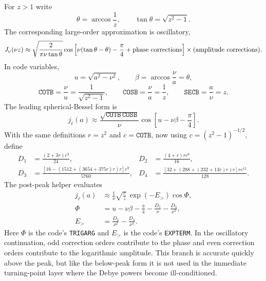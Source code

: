 \documentclass[11pt,a4paper]{article}
\newcommand{\code}[1]{\texttt{#1}}
\begin{document}
For $z>1$ write
\begin{equation}
  \theta=\arccos\frac{1}{z},\qquad
  \tan\theta=\sqrt{z^2-1}.
\end{equation}
The corresponding large-order approximation is oscillatory,
\begin{equation}
  J_\nu(\nu z) \approx
  \sqrt{\frac{2}{\pi\nu\tan\theta}}
  \cos\left[\nu(\tan\theta-\theta)-\frac{\pi}{4}+\hbox{phase corrections}\right]
  \times(\hbox{amplitude corrections}).
\end{equation}
In code variables,
\begin{equation}
  u=\sqrt{a^2-\nu^2},\qquad
  \beta=\arccos\frac{\nu}{a}=\theta,
\end{equation}
\begin{equation}
  \code{COTB}=\frac{\nu}{u}=\frac{1}{\sqrt{z^2-1}},
  \qquad
  \code{COSB}=\frac{\nu}{a}=\frac{1}{z},
  \qquad
  \code{SECB}=\frac{a}{\nu}=z .
\end{equation}
The leading spherical-Bessel form is
\begin{equation}
  j_\ell(a) \approx
  \frac{\sqrt{\code{COTB}\,\code{COSB}}}{\nu}
  \cos\left[u-\nu\beta-\frac{\pi}{4}\right].
\end{equation}
With the same definitions $r=z^2$ and $c=\code{COTB}$, now using
$c=(z^2-1)^{-1/2}$, define
\begin{align}
  D_1 &= \frac{(2+3r)c^3}{24},&
  D_2 &= \frac{(4+r)r c^6}{16},\\
  D_3 &= \frac{\left[16-\left(1512+(3654+375r)r\right)r\right]c^9}{5760},&
  D_4 &= \frac{\left[32+\left(288+(232+13r)r\right)r\right]r c^{12}}{128}.
  \label{eq:above-debye-polys}
\end{align}
The post-peak helper evaluates
\begin{align}
  j_\ell(a) &\approx \frac{1}{\nu}\sqrt{\frac{c}{z}}\,
    \exp(-E_{>})\cos\Phi,\\
  \Phi &= u-\nu\beta-\frac{\pi}{4}
    -\frac{D_1}{\nu}-\frac{D_3}{\nu^3},\\
  E_{>} &= \frac{D_2}{\nu^2}-\frac{D_4}{\nu^4}.
  \label{eq:above-debye-code}
\end{align}
Here $\Phi$ is the code's \code{TRIGARG} and $E_{>}$ is the code's
\code{EXPTERM}.  In the oscillatory continuation, odd correction orders
contribute to the phase and even correction orders contribute to the
logarithmic amplitude.  This branch is accurate quickly above the peak, but
like the below-peak form it is not used in the immediate turning-point layer
where the Debye powers become ill-conditioned.
\end{document}
